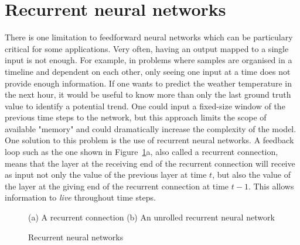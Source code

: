 \section{Recurrent neural networks}
There is one limitation to feedforward neural networks which can be particulary
critical for some applications. Very often, having an output mapped to a 
single input is not enough. For example, in problems where samples are organised
in a timeline and dependent on each other, only seeing one input at a time
does not provide enough information. If one wants to predict the weather
temperature in the next hour, it would be useful to know more than only the
last ground truth value to identify a potential trend. One 
could input a fixed-size window of the previous time steps to the network,
but this approach limits the scope of available "memory" and could dramatically
increase the complexity of the model.\\

One solution to this problem is the use of recurrent neural networks.
A feedback loop such as the one shown in Figure~\ref{fig:rnn}a, also called
a recurrent connection, means that the layer at the receiving end of the
recurrent connection will receive as input not only the value of the previous
layer at time $t$, but also the value of the layer at the giving end of the 
recurrent connection at time $t-1$. This allows information to \textit{live}
throughout time steps.\\

\begin{figure}[H]
	\centering
	{\small (a) A recurrent connection}
	\qquad
	{\small (b) An unrolled recurrent neural network}
	\caption{Recurrent neural networks}
	\label{fig:rnn}
\end{figure}

